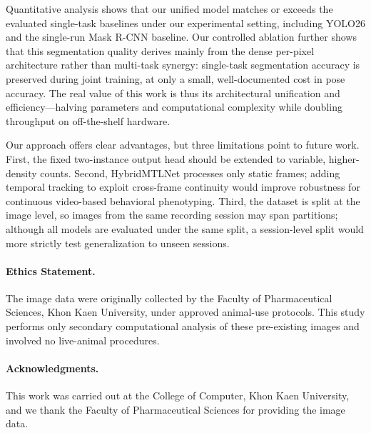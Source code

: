 \documentclass[runningheads]{llncs}
\begin{document}
Quantitative analysis shows that our unified model matches or exceeds
the evaluated single-task baselines under our experimental setting,
including YOLO26 and the single-run Mask R-CNN baseline. Our
controlled ablation further shows that this segmentation quality
derives mainly from the dense per-pixel architecture rather than
multi-task synergy: single-task segmentation accuracy is preserved
during joint training, at only a small, well-documented cost in pose
accuracy. The real value of this work is thus its
architectural unification and efficiency---halving parameters and
computational complexity while doubling throughput on off-the-shelf
hardware.

Our approach offers clear advantages, but three limitations point to
future work. First, the fixed two-instance output head should be
extended to variable, higher-density counts. Second, HybridMTLNet
processes only static frames; adding temporal tracking to exploit
cross-frame continuity would improve robustness for continuous
video-based behavioral phenotyping. Third, the dataset is split at the
image level, so images from the same recording session may span
partitions; although all models are evaluated under the same split, a
session-level split would more strictly test generalization to unseen
sessions.

\paragraph{Ethics Statement.}
The image data were originally collected by the Faculty of
Pharmaceutical Sciences, Khon Kaen University, under approved
animal-use protocols.
This study performs only secondary computational analysis of these
pre-existing images and involved no live-animal procedures.

\paragraph{Acknowledgments.}
This work was carried out at the College of Computer,
Khon Kaen University, and we thank the Faculty of Pharmaceutical
Sciences for providing the image data.



\end{document}

